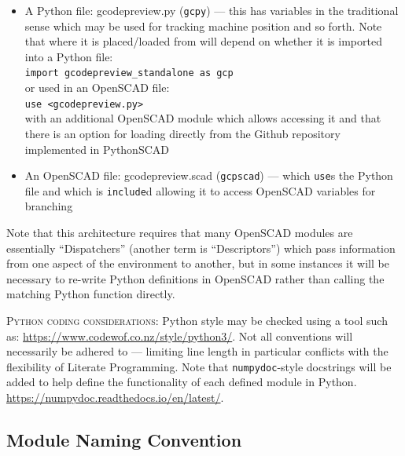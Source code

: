 \documentclass{ltxdoc}
\begin{document}
\begin{itemize}
\item A Python file: gcodepreview.py (\texttt{gcpy}) --- this has
      variables in the traditional sense which may be used for tracking machine position and so forth. 
      Note that where it is placed/loaded from will depend on whether it is imported into
      a Python file:\\
      \verb|import gcodepreview_standalone as gcp|\\ 
      or used in an OpenSCAD file:\\
      \verb|use <gcodepreview.py>|\\
      with an additional OpenSCAD module which allows accessing it and that there
      is an option for loading directly from the Github repository implemented in
      PythonSCAD
\item An OpenSCAD file: gcodepreview.scad (\texttt{gcpscad}) --- which \verb|use|s the Python file 
      and which is \texttt{include}d allowing it to access OpenSCAD variables for branching   
\end{itemize}

\noindent Note that this architecture requires that many OpenSCAD modules are essentially ``Dispatchers'' (another term is ``Descriptors'') which pass information from one aspect of the environment to another, but in some instances it will be necessary to re-write Python definitions in OpenSCAD rather than calling the matching Python function directly.

\smallskip

\noindent\textsc{Python coding considerations:} Python style may be checked using a tool such as: \url{https://www.codewof.co.nz/style/python3/}. Not all conventions will necessarily be adhered to --- limiting line length in particular conflicts with the flexibility of Literate Programming. Note that \verb|numpydoc|-style docstrings will be added to help define the functionality of each defined module in Python. \url{https://numpydoc.readthedocs.io/en/latest/}.

\subsection{Module Naming Convention}
\end{document}
